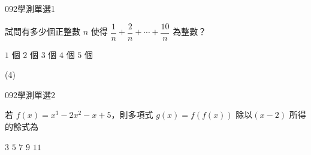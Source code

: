 \begin{QUESTIONS}
    \begin{QUESTION}
        \begin{ExamInfo}{092}{學測}{單選}{1}
        \end{ExamInfo}
        \begin{ExamAnsRateInfo}{46}{74}{46}{18}
        \end{ExamAnsRateInfo}
        \begin{QBODY}
            試問有多少個正整數 $n$ 使得 $ \dfrac{1}{n} + \dfrac{2}{n} + \cdots + \dfrac{10}{n}$ 為整數？ 
            \begin{QOPS} 
                \QOP $1$ 個 
                \QOP $2$ 個  
                \QOP $3$ 個 
                \QOP $4$ 個 
                \QOP $5$ 個
            \end{QOPS}
        \end{QBODY}
        \begin{QFROMS}
        \end{QFROMS}
        \begin{QTAGS}\end{QTAGS}
        \begin{QANS}
            (4)
        \end{QANS}
        \begin{QSOLLIST}
        \end{QSOLLIST}
        \begin{QEMPTYSPACE}
        \end{QEMPTYSPACE}
    \end{QUESTION}
    \begin{QUESTION}
        \begin{ExamInfo}{092}{學測}{單選}{2}
        \end{ExamInfo}
        \begin{ExamAnsRateInfo}{46}{83}{44}{11}
        \end{ExamAnsRateInfo}
        \begin{QBODY}
            若 $f(x)=x^3 - 2x^2 -x +5$，則多項式 $g(x)=f(f(x))$ 除以$(x-2)$ 所得的餘式為 
            \begin{QOPS} 
                \QOP $3 $
                \QOP $5 $
                \QOP $7 $
                \QOP $9 $
                \QOP $11$
            \end{QOPS}
        \end{QBODY}
        \begin{QFROMS}

\end{QFROMS}
\end{QUESTION}
\end{QUESTIONS}
